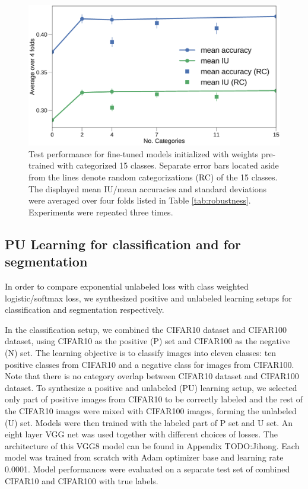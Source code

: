 \begin{figure}[t]
\centering
   \includegraphics[width=1.\linewidth]{img/num_classes.eps}
\caption{
Test performance for fine-tuned models initialized with weights pre-trained with categorized 15 classes.
Separate error bars located aside from the lines denote random categorizations (RC) of the 15 classes.
The displayed mean IU/mean accuracies and standard deviations were averaged over four folds listed in Table \ref{tab:robustness}.
Experiments were repeated three times.
}
\label{fig:categories}
\end{figure}


\subsection{PU Learning for classification and for segmentation}
\label{subsec:pulearning}
\noindent
In order to compare exponential unlabeled loss with class weighted logistic/softmax loss, we synthesized positive and unlabeled learning setups for classification and segmentation respectively.

\noindent
In the classification setup, we combined the CIFAR10 dataset and CIFAR100 dataset, using CIFAR10 as the positive (P) set and CIFAR100 as the negative (N) set.
The learning objective is to classify images into eleven classes: ten positive classes from CIFAR10 and a negative class for images from CIFAR100.
Note that there is no category overlap between CIFAR10 dataset and CIFAR100 dataset.
To synthesize a positive and unlabeled (PU) learning setup, we selected only part of positive images from CIFAR10 to be correctly labeled and the rest of the CIFAR10 images were mixed with CIFAR100 images, forming the unlabeled (U) set.
Models were then trained with the labeled part of P set and U set.
An eight layer VGG net was used together with different choices of losses.
The architecture of this VGG8 model can be found in Appendix {TODO:Jihong}.
Each model was trained from scratch with Adam optimizer base and learning rate 0.0001.
Model performances were evaluated on a separate test set of combined CIFAR10 and CIFAR100 with true labels.

